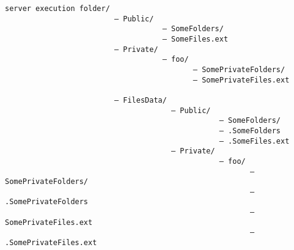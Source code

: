 \begin{verbatim}
server execution folder/
                         — Public/
                                    — SomeFolders/
                                    — SomeFiles.ext
                         — Private/
                                    — foo/
                                           — SomePrivateFolders/
                                           — SomePrivateFiles.ext

                         — FilesData/
                                      — Public/
                                                 — SomeFolders/
                                                 – .SomeFolders
                                                 — .SomeFiles.ext
                                      — Private/
                                                 — foo/
                                                        — SomePrivateFolders/
                                                        — .SomePrivateFolders
                                                        — SomePrivateFiles.ext
                                                        — .SomePrivateFiles.ext
\end{verbatim}